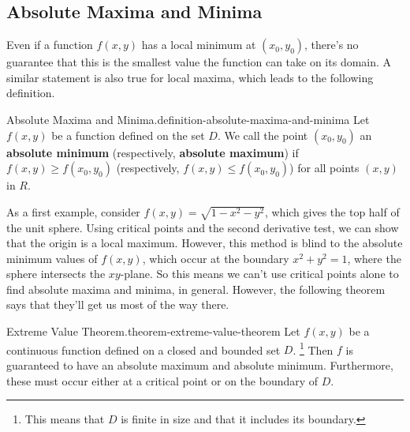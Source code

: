 \documentclass[10pt,]{book}
\newcommand{\terminology}[1]{\textbf{#1}}
\numberwithin{equation}{section}
\begin{document}
\subsection[{Absolute Maxima and Minima}]{Absolute Maxima and Minima}\label{subsection-absolute-maxima-and-minima}
\hypertarget{p-1428}{}%
Even if a function \(f(x,y)\) has a local minimum at \((x_{0},y_{0})\), there's no guarantee that this is the smallest value the function can take on its domain. A similar statement is also true for local maxima, which leads to the following definition.%
\begin{definition}{Absolute Maxima and Minima.}{definition-absolute-maxima-and-minima}%
\hypertarget{p-1429}{}%
Let \(f(x,y)\) be a function defined on the set \(D\). We call the point \((x_{0},y_{0})\) an \terminology{absolute minimum} (respectively, \terminology{absolute maximum}) if \(f(x,y)\geq f(x_{0},y_{0})\) (respectively, \(f(x,y)\leq f(x_{0},y_{0})\)) for all points \((x,y)\) in \(R\).%
\end{definition}
\hypertarget{p-1430}{}%
As a first example, consider \(f(x,y) = \sqrt{1 - x^{2} - y^{2}}\), which gives the top half of the unit sphere. Using critical points and the second derivative test, we can show that the origin is a local maximum. However, this method is blind to the absolute minimum values of \(f(x,y)\), which occur at the boundary \(x^{2} + y^{2} = 1\), where the sphere intersects the \(xy\)-plane. So this means we can't use critical points alone to find absolute maxima and minima, in general. However, the following theorem says that they'll get us most of the way there.%
\begin{theorem}{Extreme Value Theorem.}{}{theorem-extreme-value-theorem}%
\hypertarget{p-1431}{}%
Let \(f(x,y)\) be a continuous function defined on a closed and bounded set \(D\). \footnote{This means that \(D\) is finite in size and that it includes its boundary.\label{fn-7}} Then \(f\) is guaranteed to have an absolute maximum and absolute minimum. Furthermore, these must occur either at a critical point or on the boundary of \(D\).%
\end{theorem}
\end{document}
